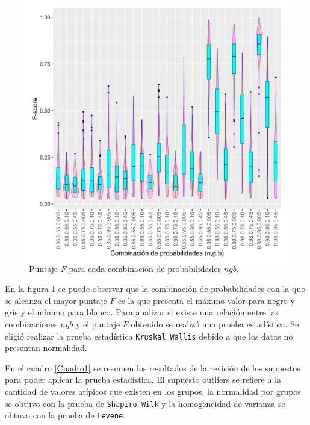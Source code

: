 \documentclass{article}
\begin{document}
\begin{figure} [h!]%
    \centering
    \includegraphics[width=15cm]{Figura1.png} %
    \caption{Puntaje $F$ para cada combinación de probabilidades $ngb$.}
    \label{f1}
\end{figure}

En la figura \ref{f1} se puede observar que la combinación de probabilidades con la que se alcanza el mayor puntaje $F$ es la que presenta el máximo valor para negro y gris y el mínimo para blanco. Para analizar si existe una relación entre las combinaciones $ngb$ y el puntaje $F$ obtenido se realizó una prueba estadística. Se eligió realizar la prueba estadística \texttt{Kruskal Wallis} debido a que los datos no presentan normalidad.
\bigskip

En el cuadro \ref{Cuadro1} se  resumen los resultados de la revisión de los supuestos para poder aplicar la prueba estadística. El supuesto outliers se refiere a la cantidad de valores atípicos que existen en los grupos, la normalidad por grupos se obtuvo con la prueba de \texttt{Shapiro Wilk} y la homogeneidad de varianza se obtuvo con la prueba de \texttt{Levene}.
\end{document}
